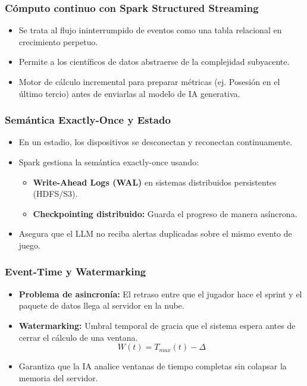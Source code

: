 \documentclass[aspectratio=169]{beamer}
\begin{document}
\begin{frame}\frametitle{Cómputo continuo con Spark Structured Streaming}
\begin{itemize}
    \item Se trata al flujo ininterrumpido de eventos como una tabla relacional en crecimiento perpetuo.
    \item Permite a los científicos de datos abstraerse de la complejidad subyacente.
    \item Motor de cálculo incremental para preparar métricas (ej. Posesión en el último tercio) antes de enviarlas al modelo de IA generativa.
\end{itemize}
\end{frame}

\begin{frame}\frametitle{Semántica Exactly-Once y Estado}
\begin{itemize}
    \item En un estadio, los dispositivos se desconectan y reconectan continuamente.
    \item Spark gestiona la semántica exactly-once usando:
    \begin{itemize}
        \item \textbf{Write-Ahead Logs (WAL)} en sistemas distribuidos persistentes (HDFS/S3).
        \item \textbf{Checkpointing distribuido:} Guarda el progreso de manera asíncrona.
    \end{itemize}
    \item Asegura que el LLM no reciba alertas duplicadas sobre el mismo evento de juego.
\end{itemize}
\end{frame}

\begin{frame}\frametitle{Event-Time y Watermarking}
\begin{itemize}
    \item \textbf{Problema de asincronía:} El retraso entre que el jugador hace el sprint y el paquete de datos llega al servidor en la nube.
    \item \textbf{Watermarking:} Umbral temporal de gracia que el sistema espera antes de cerrar el cálculo de una ventana.
    \[
    W(t) = T_{max}(t) - \Delta
    \]
    \item Garantiza que la IA analice ventanas de tiempo completas sin colapsar la memoria del servidor.
\end{itemize}
\end{frame}
\end{document}
